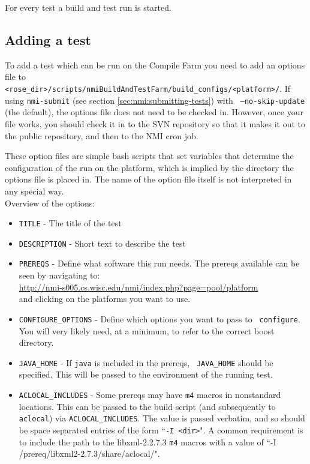 For every test a build and test run is started.

\subsection{Adding a test}
To add a test which can be run on the Compile Farm you need to add an options
file to {\tt
<rose\_dir>/scripts/nmiBuildAndTestFarm/build\_configs/<platform>/}.  If using
{\tt nmi-submit} (see section \ref{sec:nmi:submitting-tests}) with {\tt
--no-skip-update} (the default), the options file does not need to be checked
in.  However, once your file works, you should check it in to the SVN repository
so that it makes it out to the public repository, and then to the NMI cron job.

These option files are simple bash scripts that set variables that determine the
configuration of the run on the platform, which is implied by the directory the
options file is placed in.  The name of the option file itself is not
interpreted in any special way.\\

Overview of the options:
\begin{itemize}
 \item {\tt TITLE} - The title of the test
 \item {\tt DESCRIPTION} - Short text to describe the test
 \item {\tt PREREQS} - Define what software this run needs. The prereqs available
                       can be seen by navigating to: \\
                       \url{http://nmi-s005.cs.wisc.edu/nmi/index.php?page=pool/platform} \\
                       and clicking on the platforms you want to use.
 \item {\tt CONFIGURE\_OPTIONS} - Define which options you want to pass to {\tt
                         configure}.  You will very likely need, at a minimum,
                         to refer to the correct boost directory.

 \item {\tt JAVA\_HOME} - If {\tt java} is included in the prereqs, {\tt
						 JAVA\_HOME} should be specified.  This will be passed
						 to the environment of the running test.

 \item {\tt ACLOCAL\_INCLUDES} - Some prereqs may have {\tt m4} macros in
 nonstandard locations.  This can be passed to the build script (and
 subsequently to {\tt aclocal}) via {\tt ACLOCAL\_INCLUDES}.  The value is
 passed verbatim, and so should be space separated entries of the form ``{\tt -I
 <dir>}".  A common requirement is to include the path to the libxml-2.2.7.3
 {\tt m4} macros with a value of ``-I /prereq/libxml2-2.7.3/share/aclocal/".
 \end{itemize}

